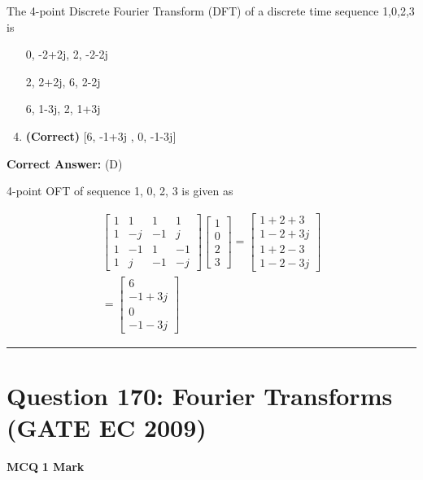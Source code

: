\documentclass[11pt,a4paper]{article}
\begin{document}
\noindent The 4-point Discrete Fourier Transform (DFT) of a discrete time sequence {1,0,2,3} is


\begin{enumerate}[label=(\Alph*)]
    \item [0, -2+2j, 2, -2-2j]
    \item [2, 2+2j, 6, 2-2j]
    \item [6, 1-3j, 2, 1+3j]
    \item \textbf{(Correct)} [6, -1+3j , 0, -1-3j]
\end{enumerate}

\noindent \textbf{Correct Answer:} (D)

\begin{tcolorbox}[solbox, title=Detailed Solution -- Question 169]
4-point OFT of sequence {1, 0, 2, 3} is given as

\[
\begin{aligned} \left[\begin{array}{cccc} 1 & 1 & 1 & 1 \\ 1 & -j & -1 & j \\ 1 & -1 & 1 & -1 \\ 1 & j & -1 & -j \end{array}\right]\left[\begin{array}{c} 1 \\ 0 \\ 2 \\ 3 \end{array}\right]=\left[\begin{array}{c} 1+2+3 \\ 1-2+3 j \\ 1+2-3 \\ 1-2-3 j \end{array}\right]\\ =\left[\begin{array}{c} 6 \\ -1+3 j \\ 0 \\ -1-3 j \end{array}\right] \end{aligned}
\]
\end{tcolorbox}

\vspace{1.5em}
\hrule
\vspace{1.5em}

\section*{Question 170: Fourier Transforms (GATE EC 2009)}
\noindent \textbf{\color{primary}MCQ} \hfill \textbf{\color{secondary}1 Mark}
\end{document}
